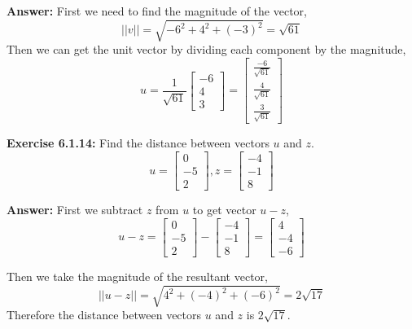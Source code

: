 \documentclass{amsart}
\begin{document}
\begin{enumerate}
\noindent \textbf{Answer: } First we need to find the magnitude of the vector,
\begin{equation*}
||v|| = \sqrt{-6^2+4^2+(-3)^2} = \sqrt{61}
\end{equation*}
Then we can get the unit vector by dividing each component by the magnitude,
\begin{equation*}
u = 
\frac{1}{\sqrt{61}}
\begin{bmatrix}
-6\\
4\\
3
\end{bmatrix}
 = 
 \begin{bmatrix}
\frac{-6}{\sqrt{61}}\\
\frac{4}{\sqrt{61}}\\
\frac{3}{\sqrt{61}}
\end{bmatrix}
\end{equation*}
\vspace{1in}


\noindent\textbf{Exercise 6.1.14: } Find the distance between vectors $u$ and $z$.
\begin{equation*}
u = 
\begin{bmatrix}
0\\
-5\\
2
\end{bmatrix}
,
z = 
\begin{bmatrix}
-4\\
-1\\
8
\end{bmatrix}
\end{equation*}

\noindent \textbf{Answer: }First we subtract $z$ from $u$ to get vector $u-z$,
\begin{equation*}
u-z = 
\begin{bmatrix}
0\\
-5\\
2
\end{bmatrix}
 - 
 \begin{bmatrix}
-4\\
-1\\
8
\end{bmatrix}
= 
 \begin{bmatrix}
4\\
-4\\
-6
\end{bmatrix}
\end{equation*}

Then we take the magnitude of the resultant vector,
\begin{equation*}
||u-z|| = \sqrt{4^2+(-4)^2+(-6)^2} = 2\sqrt{17}
\end{equation*}
Therefore the distance between vectors $u$ and $z$ is $2\sqrt{17}$.
\vspace{1in}




\end{enumerate}
\end{document}
